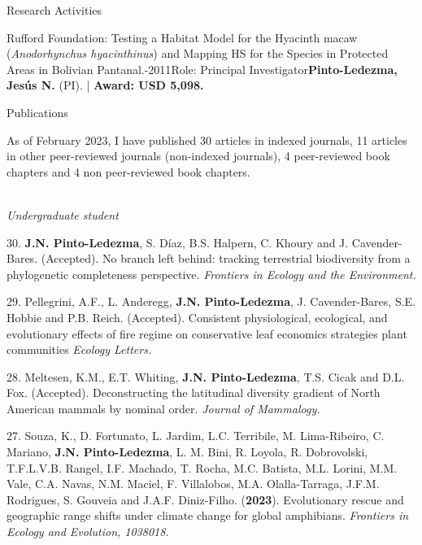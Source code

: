 \documentclass{resume} %
\begin{document}
\begin{rSection}{Research Activities}
\begin{pSubsection}{Rufford Foundation: }{\normalfont Testing a Habitat Model for the Hyacinth macaw (\emph{Anodorhynchus hyacinthinus}) and Mapping HS for the Species in Protected Areas in Bolivian Pantanal.}{-2011}{\normalfont Role: Principal Investigator}{\textbf{Pinto-Ledezma, Jesús N.} \normalfont (PI). | {\bf Award: USD 5,098.}}
\end{pSubsection}

\end{rSection}


\begin{rSection}{Publications}

\normalfont As of February 2023, I have published 30 articles in indexed journals, 11 articles in other peer-reviewed journals (non-indexed journals), 4 peer-reviewed book chapters and 4 non peer-reviewed book chapters.

 \\
{\em *Undergraduate student}

{30.} {\bf{J.N. Pinto-Ledezma}}, {S. Díaz, B.S. Halpern, C. Khoury and J. Cavender-Bares. (Accepted). No branch left behind: tracking terrestrial biodiversity from a phylogenetic completeness perspective.} {\em Frontiers in Ecology and the Environment.} 

{29.} {Pellegrini, A.F., L. Anderegg, } {\bf{J.N. Pinto-Ledezma}}, {J. Cavender-Bares, S.E. Hobbie and P.B. Reich. (Accepted). Consistent physiological, ecological, and evolutionary effects of fire regime on conservative leaf economics strategies plant communities} {\em Ecology Letters.}

{28.} {Meltesen, K.M., E.T. Whiting,} {\bf{J.N. Pinto-Ledezma}}, {T.S. Cicak and D.L. Fox. (Accepted). Deconstructing the latitudinal diversity gradient of North American mammals by nominal order.} {\em Journal of Mammalogy.}

{27.} {Souza, K., D. Fortunato, L. Jardim, L.C. Terribile, M. Lima-Ribeiro, C. Mariano,} {\bf{J.N. Pinto-Ledezma}}, {L. M. Bini, R. Loyola, R. Dobrovolski, T.F.L.V.B. Rangel, I.F. Machado, T. Rocha, M.C. Batista, M.L. Lorini, M.M. Vale, C.A. Navas, N.M. Maciel, F. Villalobos, M.A. Olalla-Tarraga, J.F.M. Rodrigues, S. Gouveia and J.A.F. Diniz-Filho. ({\bf{2023}}). Evolutionary rescue and geographic range shifts under climate change for global amphibians.} {\em Frontiers in Ecology and Evolution, 1038018.}


\end{rSection}
\end{document}
